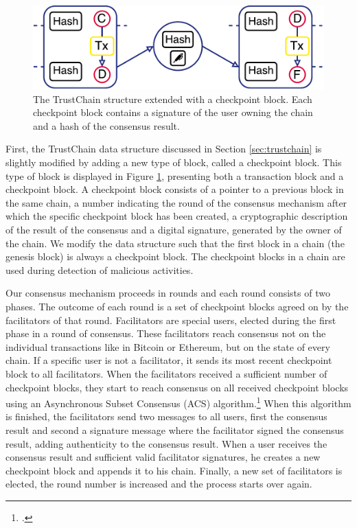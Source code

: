 \documentclass[USenglish]{article}
\begin{document}
\begin{figure}[t]
	\centering
	\includegraphics[width=0.8\columnwidth]{assets/trustchain_cp}
	\caption{The TrustChain structure extended with a checkpoint block. Each checkpoint block contains a signature of the user owning the chain and a hash of the consensus result.}
	\label{fig:trustchain_cp}
\end{figure}

First, the TrustChain data structure discussed in Section \ref{sec:trustchain} is slightly modified by adding a new type of block, called a checkpoint block.
This type of block is displayed in Figure \ref{fig:trustchain_cp}, presenting both a transaction block and a checkpoint block.
A checkpoint block consists of a pointer to a previous block in the same chain, a number indicating the round of the consensus mechanism after which the specific checkpoint block has been created, a cryptographic description of the result of the consensus and a digital signature, generated by the owner of the chain.
We modify the data structure such that the first block in a chain (the genesis block) is always a checkpoint block.
The checkpoint blocks in a chain are used during detection of malicious activities.

Our consensus mechanism proceeds in rounds and each round consists of two phases.
The outcome of each round is a set of checkpoint blocks agreed on by the facilitators of that round.
Facilitators are special users, elected during the first phase in a round of consensus.
These facilitators reach consensus not on the individual transactions like in Bitcoin or Ethereum, but on the state of every chain.
If a specific user is not a facilitator, it sends its most recent checkpoint block to all facilitators.
When the facilitators received a sufficient number of checkpoint blocks, they start to reach consensus on all received checkpoint blocks using an Asynchronous Subset Consensus (ACS) algorithm.\footcite{miller2016honey}
When this algorithm is finished, the facilitators send two messages to all users, first the consensus result and second a signature message where the facilitator signed the consensus result, adding authenticity to the consensus result.
When a user receives the consensus result and sufficient valid facilitator signatures, he creates a new checkpoint block and appends it to his chain.
Finally, a new set of facilitators is elected, the round number is increased and the process starts over again.
\end{document}
